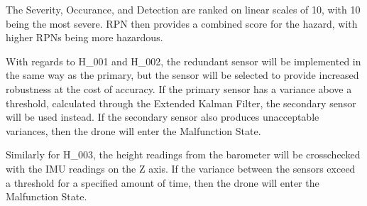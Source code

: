 \documentclass{article}
\begin{document}
The Severity, Occurance, and Detection are ranked on linear scales of 10, with 10 being the most severe. RPN then provides a combined score for the hazard, with higher RPNs being more hazardous.

With regards to H\_001 and H\_002, the redundant sensor will be implemented in the same way as the primary, but the sensor will be selected to provide increased robustness at the cost of accuracy. If the primary sensor has a variance above a threshold, calculated through the Extended Kalman Filter, the secondary sensor will be used instead. If the secondary sensor also produces unacceptable variances, then the drone will enter the Malfunction State.

Similarly for H\_003, the height readings from the barometer will be crosschecked with the IMU readings on the Z axis. If the variance between the sensors exceed a threshold for a specified amount of time, then the drone will enter the Malfunction State.
\end{document}
